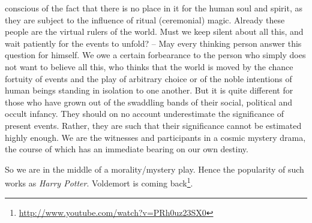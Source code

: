 \begin{quotex}
conscious of the fact that there is no place in it for the human soul and spirit, as they are subject to the influence of ritual (ceremonial) magic. Already these people are the virtual rulers of the world. Must we keep silent about all this, and wait patiently for the events to unfold? -- May every thinking person answer this question for himself. We owe a certain forbearance to the person who simply does not want to believe all this, who thinks that the world is moved by the chance fortuity of events and the play of arbitrary choice or of the noble intentions of human beings standing in isolation to one another. But it is quite different for those who have grown out of the swaddling bands of their social, political and occult infancy. They should on no account underestimate the significance of present events. Rather, they are such that their significance cannot be estimated highly enough. We are the witnesses and participants in a cosmic mystery drama, the course of which has an immediate bearing on our own destiny.
\end{quotex}


So we are in the middle of a morality/mystery play. Hence the popularity of such works as \emph{Harry Potter}. Voldemort is coming back\footnote{\url{http://www.youtube.com/watch?v=PRh0uz23SX0}}.

